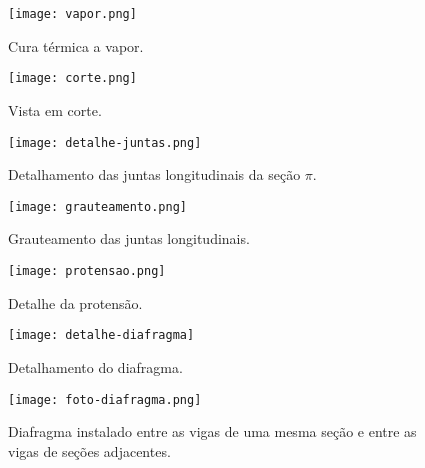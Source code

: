 \begin{figure}[htb]
	\caption{\label{vapor}Cura térmica a vapor.}
	\begin{center}
		\texttt{[image: vapor.png]}
	\end{center}
\end{figure}

\begin{figure}[htb]
	\caption{\label{corte}Vista em corte.}
	\begin{center}
		\texttt{[image: corte.png]}
	\end{center}
\end{figure}

\begin{figure}[htb]
	\caption{\label{detalhe-juntas}Detalhamento das juntas longitudinais da seção $ \pi $.}
	\begin{center}
		\texttt{[image: detalhe-juntas.png]}
	\end{center}
\end{figure}

\begin{figure}[htb]
	\caption{\label{grauteamento}Grauteamento das juntas longitudinais.}
	\begin{center}
		\texttt{[image: grauteamento.png]}
	\end{center}
\end{figure}

\begin{figure}[htb]
	\caption{\label{protensao}Detalhe da protensão.}
	\begin{center}
		\texttt{[image: protensao.png]}
	\end{center}
\end{figure}


\begin{figure}[htb]
	\caption{\label{detalhe-diafragma}Detalhamento do diafragma.}
	\begin{center}
		\texttt{[image: detalhe-diafragma]}
	\end{center}
\end{figure}

\begin{figure}[htb]
	\caption{\label{foto-diafragma}Diafragma instalado entre as vigas de uma mesma seção e entre as vigas de seções adjacentes.}
	\begin{center}
		\texttt{[image: foto-diafragma.png]}
	\end{center}
\end{figure}

